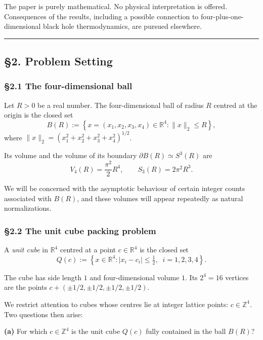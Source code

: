 \documentclass[a4paper,11pt]{article}
\theoremstyle{definition}
\begin{document}
The paper is purely mathematical. No physical interpretation is offered.
Consequences of the results, including a possible connection to
four-plus-one-dimensional black hole thermodynamics, are pursued
elsewhere.

\begin{center}\rule{0.5\linewidth}{0.5pt}\end{center}

\subsection{§2. Problem Setting}\label{problem-setting}

\subsubsection{§2.1 The four-dimensional
ball}\label{the-four-dimensional-ball}

Let \(R > 0\) be a real number. The four-dimensional ball of radius
\(R\) centred at the origin is the closed set
\[B(R) := \left\{x = (x_1, x_2, x_3, x_4) \in \mathbb{R}^4 : \|x\|_2 \le R\right\},\]
where \(\|x\|_2 = (x_1^2 + x_2^2 + x_3^2 + x_4^2)^{1/2}\).

Its volume and the volume of its boundary
\(\partial B(R) \simeq S^3(R)\) are
\[V_4(R) = \frac{\pi^2}{2} R^4, \qquad S_3(R) = 2\pi^2 R^3.\]

We will be concerned with the asymptotic behaviour of certain integer
counts associated with \(B(R)\), and these volumes will appear
repeatedly as natural normalizations.

\subsubsection{§2.2 The unit cube packing
problem}\label{the-unit-cube-packing-problem}

A \emph{unit cube} in \(\mathbb{R}^4\) centred at a point
\(c \in \mathbb{R}^4\) is the closed set
\[Q(c) := \left\{x \in \mathbb{R}^4 : |x_i - c_i| \le \tfrac{1}{2}, \;\; i = 1, 2, 3, 4\right\}.\]

The cube has side length \(1\) and four-dimensional volume \(1\). Its
\(2^4 = 16\) vertices are the points
\(c + (\pm 1/2, \pm 1/2, \pm 1/2, \pm 1/2)\).

We restrict attention to cubes whose centres lie at integer lattice
points: \(c \in \mathbb{Z}^4\). Two questions then arise:

\textbf{(a)} For which \(c \in \mathbb{Z}^4\) is the unit cube \(Q(c)\)
fully contained in the ball \(B(R)\)?
\end{document}
